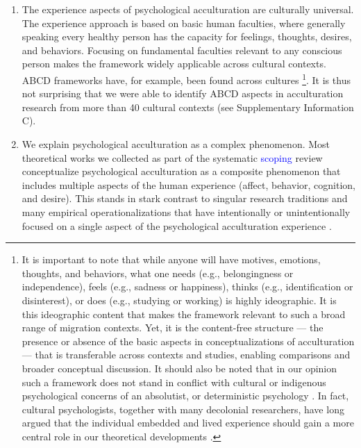 \documentclass[man, 12pt, a4paper, mask]{apa7}
\begin{document}
\begin{enumerate}
\item The experience aspects of psychological acculturation are culturally universal. The experience approach is based on basic human faculties, where generally speaking every healthy person has the capacity for feelings, thoughts, desires, and behaviors. Focusing on fundamental faculties relevant to any conscious person makes the framework widely applicable across cultural contexts. ABCD frameworks have, for example, been found across cultures \citep[e.g.,][]{Bhawuk2011}\footnote{It is important to note that while anyone will have motives, emotions, thoughts, and behaviors, what one needs (e.g., belongingness or independence), feels (e.g., sadness or happiness), thinks (e.g., identification or disinterest), or does (e.g., studying or working) is highly ideographic. It is this ideographic content that makes the framework relevant to such a broad range of migration contexts. Yet, it is the content-free structure --- the presence or absence of the basic aspects in conceptualizations of acculturation --- that is transferable across contexts and studies, enabling comparisons and broader conceptual discussion. It should also be noted that in our opinion such a framework does not stand in conflict with cultural or indigenous psychological concerns of an absolutist, or deterministic psychology \citep[e.g.,][]{Kim2006a}. In fact, cultural psychologists, together with many decolonial researchers, have long argued that the individual embedded and lived experience should gain a more central role in our theoretical developments \citep[e.g., ontological turn;][]{Pedersen2020}.}. It is thus not surprising that we were able to identify ABCD aspects in acculturation research from more than 40 cultural contexts (see Supplementary Information C).

\item We explain psychological acculturation as a complex phenomenon. Most theoretical works we collected as part of the systematic \textcolor{blue}{scoping} review conceptualize psychological acculturation as a composite phenomenon that includes multiple aspects of the human experience (affect, behavior, cognition, and desire). This stands in stark contrast to singular research traditions and many empirical operationalizations that have intentionally or unintentionally focused on a single aspect of the psychological acculturation experience \citep[also see][]{Ward2001}.
\end{enumerate}
\end{document}

